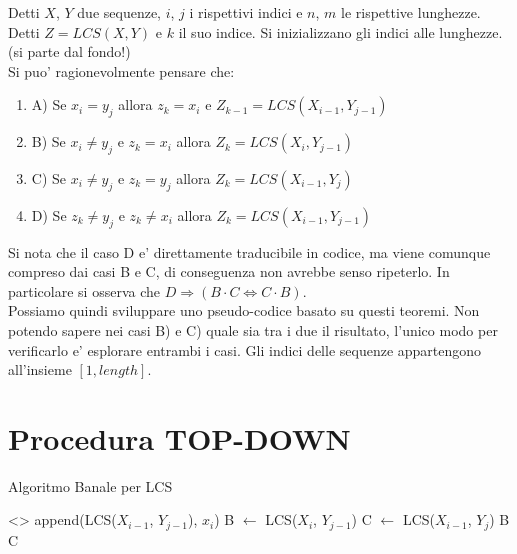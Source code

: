Detti $X$, $Y$ due sequenze, $i$, $j$ i rispettivi indici e $n$, $m$ le rispettive lunghezze.
Detti $Z = LCS(X, Y)$ e $k$ il suo indice. Si inizializzano gli indici alle lunghezze. (si parte dal fondo!) \\

Si puo' ragionevolmente pensare che:

\begin{enumerate}

\item A) Se $x_{i} = y_{j}$ allora $z_{k} = x_{i}$ e $Z_{k-1} = LCS(X_{i-1}, Y_{j-1})$

\item B) Se $x_{i} \ne y_{j}$ e $z_{k} = x_{i}$ allora $Z_{k}= LCS(X_{i}, Y_{j-1})$

\item C) Se $x_{i} \ne y_{j}$ e $z_{k} = y_{j}$ allora $Z_{k}= LCS(X_{i-1}, Y_{j})$

\item D) Se $z_{k} \ne y_{j}$ e $z_{k} \ne x_{i}$ allora $Z_{k} = LCS(X_{i-1}, Y_{j-1})$

\end{enumerate}

Si nota che il caso D e' direttamente traducibile in codice, ma viene comunque compreso dai casi B e C, di conseguenza non avrebbe senso ripeterlo.
In particolare si osserva che $D \Rightarrow (B \cdot C \Leftrightarrow C \cdot B)$. \\

Possiamo quindi sviluppare uno pseudo-codice basato su questi teoremi.
Non potendo sapere nei casi B) e C) quale sia tra i due il risultato, l'unico modo per verificarlo e' esplorare entrambi i casi.
Gli indici delle sequenze appartengono all'insieme $[1, length]$.

\newpage

\section{Procedura TOP-DOWN}

\begin{algorithm}
    \renewcommand\thealgorithm{}
    \caption{Algoritmo Banale per LCS}
    \begin{algorithmic}
                \State \Return <>
            \Else
                    \State \Return append(LCS($X_{i-1}$, $Y_{j-1}$), $x_{i}$)
                \Else
                    \State B $\gets$ LCS($X_{i}$, $Y_{j-1}$)
                    \State C $\gets$ LCS($X_{i-1}$, $Y_{j}$)
                        \State \Return B
                    \Else
                        \State \Return C
                    \EndIf
                \EndIf
            \EndIf
        \EndProcedure
    \end{algorithmic}
\end{algorithm}

